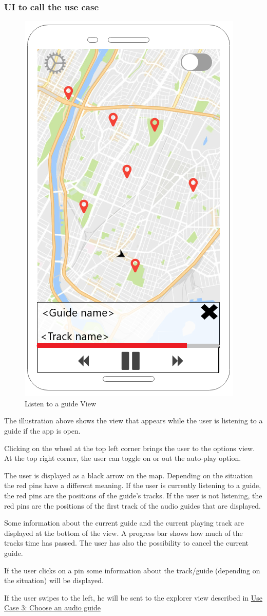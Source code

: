 \documentclass[12pt]{article}
\theoremstyle{definition}
\newenvironment{text}{
   \setlength{\parindent}{0pt}
   \color{black}
}{}
\begin{document}
    \subsubsection{UI to call the use case}
    \begin{figure}[hbt!]
        \label{fig:usecase2}
        \centering
        \includegraphics[width=0.35\linewidth]{UIs/ListeningView.PNG}
        \caption{Listen to a guide View}
    \end{figure}
    \begin{text}
    The illustration above shows the view that appears while the user is listening to a guide if the app is open.
    
    Clicking on the wheel at the top left corner brings the user to the options view. At the top right corner, the user can toggle on or out the auto-play option.
    
    The user is displayed as a black arrow on the map. Depending on the situation the red pins have a different meaning. If the user is currently listening to a guide, the red pins are the positions of the guide's tracks. If the user is not listening, the red pins are the positions of the first track of the audio guides that are displayed.
    
    Some information about the current guide and the current playing track are displayed at the bottom of the view. A progress bar shows how much of the tracks time has passed. The user has also the possibility to cancel the current guide. 
    
    If the user clicks on a pin some information about the track/guide (depending on the situation) will be displayed.
    
    If the user swipes to the left, he will be sent to the explorer view described in \hyperref[sec:gnsu]{Use Case 3: Choose an audio guide}
    \end{text}
    
\end{document}
